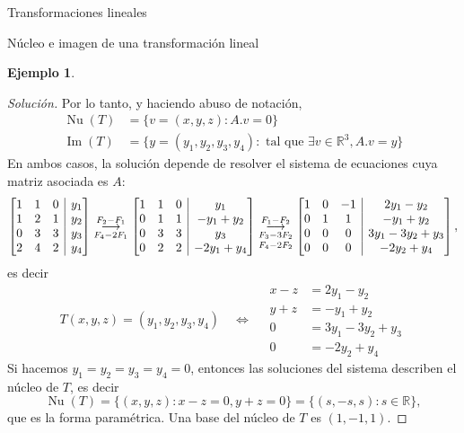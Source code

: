 \documentclass[a4paper,12pt,twoside,spanish,reqno]{amsbook}
\theoremstyle{definition}
\newtheorem{ejemplo}{Ejemplo}[section]
\theoremstyle{remark}
\newcommand{\img}{\operatorname{Im}}
\newcommand{\nuc}{\operatorname{Nu}}
\newcommand{\R}{\mathbb R}
\begin{document}
\begin{chapter}{Transformaciones lineales}
\begin{section}{Núcleo e imagen de una transformación lineal}
\begin{ejemplo}
\begin{proof}[Solución]
        
        Por lo tanto, y haciendo abuso de notación,  
        \begin{align*}
        \nuc(T) &= \{v=(x,y,z):   A.{v}=0\}\\
        \img(T) &= \{y= (y_1,y_2,y_3,y_4): \text{ tal que } \exists v \in \R^3, A.{v} = {y}  \}
        \end{align*}
        En  ambos casos, la solución depende de resolver el sistema de ecuaciones cuya matriz asociada es $A$:
        \begin{equation*}
        \left[\begin{array}{@{}*{3}{c}|c@{}}1&1&0&y_1\\1&2&1&y_2\\0&3&3&y_3\\2&4&2&y_4 \end{array}\right]
        \underset{F_4-2F_1}{\stackrel{F_2 -F_1}{\longrightarrow}} 
        \left[\begin{array}{@{}*{3}{c}|c@{}}1&1&0&y_1\\0&1&1&-y_1+y_2\\0&3&3&y_3\\0&2&2&-2y_1 +y_4 \end{array}\right]
        \underset{F_4-2F_2}{\underset{F_3-3F_2}{\stackrel{F_1 -F_2}{\longrightarrow}} }
        \left[\begin{array}{@{}*{3}{c}|c@{}}1&0&-1&2y_1-y_2\\0&1&1&-y_1+y_2\\0&0&0&3y_1-3y_2+y_3\\0&0&0&-2y_2 +y_4 \end{array}\right],
        \end{equation*}
        es decir
        \begin{equation}\label{eq-gen}
        T(x,y,z) = (y_1,y_2,y_3,y_4) \quad\Leftrightarrow \quad
        \begin{array}{rl}
        x -z &= 2y_1-y_2\\ 
        y +z &= -y_1+y_2\\
        0&=3y_1-3y_2+y_3 \\
        0&= -2y_2 +y_4
        \end{array}
        \end{equation}
        Si hacemos $y_1 = y_2 = y_3 = y_4 = 0$, entonces las soluciones del sistema describen el núcleo de $T$, es decir
        $$
        \nuc(T) = \{(x,y,z):x-z=0, y+z =0 \} = \{(s,-s,s):s \in \R \},
        $$
        que es la forma paramétrica. Una base del núcleo de $T$  es $(1,-1,1)$. 
        

\end{proof}
\end{ejemplo}
\end{section}
\end{chapter}
\end{document}
